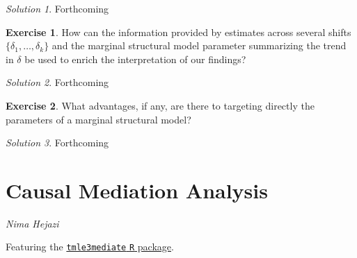 \documentclass[
  12pt, krantz2,
]{krantz}
\newcommand{\passthrough}[1]{#1}
\newcommand{\1}{\mathbbm{1}}
\theoremstyle{definition}
\theoremstyle{definition}
\theoremstyle{definition}
\newtheorem{exercise}{Exercise}[chapter]
\theoremstyle{definition}
\theoremstyle{remark}
\newtheorem*{solution}{Solution}
\begin{document}
\begin{solution}
Forthcoming
\end{solution}

\begin{exercise}
How can the information provided by estimates across several shifts \(\{ \delta_1, \ldots, \delta_k \}\) and the marginal structural model parameter
summarizing the trend in \(\delta\) be used to enrich the interpretation of our
findings?
\end{exercise}

\begin{solution}
Forthcoming
\end{solution}

\begin{exercise}
What advantages, if any, are there to targeting directly the parameters of a
marginal structural model?
\end{exercise}

\begin{solution}
Forthcoming
\end{solution}

\hypertarget{causal-mediation-analysis}{%
\chapter{Causal Mediation Analysis}\label{causal-mediation-analysis}}

\emph{Nima Hejazi}

Featuring the \href{https://github.com/tlverse/tmle3mediate}{\passthrough{\lstinline!tmle3mediate!} \passthrough{\lstinline!R!}
package}.
\end{document}
